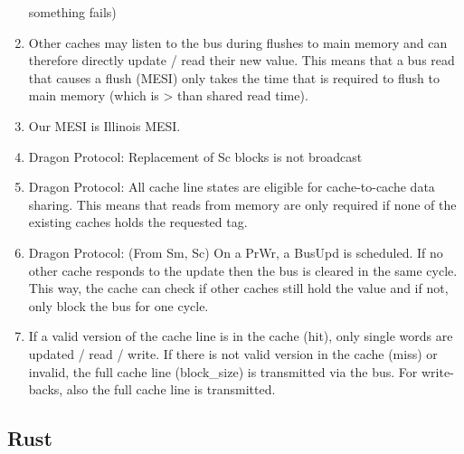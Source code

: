 \begin{enumerate}
          something fails)
    \item Other caches may listen to the bus during flushes to main memory and can therefore directly
          update / read their new value. This means that a bus read that causes a flush (MESI) only takes the
          time that is required to flush to main memory (which is > than shared read time).
    \item Our MESI is Illinois MESI.
    \item Dragon Protocol: Replacement of Sc blocks is not broadcast
    \item Dragon Protocol: All cache line states are eligible for cache-to-cache data sharing. This
          means that reads from memory are only required if none of the existing caches holds the requested
          tag.
    \item Dragon Protocol: (From Sm, Sc) On a PrWr, a BusUpd is scheduled. If no other cache responds to
          the update then the bus is cleared in the same cycle. This way, the cache can check if other caches
          still hold the value and if not, only block the bus for one cycle.
    \item If a valid version of the cache line is in the cache (hit), only single words are updated /
          read / write. If there is not valid version in the cache (miss) or invalid, the full cache line
          (block\_size) is transmitted via the bus. For write-backs, also the full cache line is transmitted.

\end{enumerate}

\subsection{Rust}
